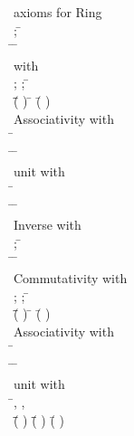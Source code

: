 \begin{hetcasl}
\> {\small{}\KW{\%\%} axioms for Ring}\\
\> \Ax{\forall}  \Ax{:} ; \= \Ax{:}  \\
\> \Ax{\bullet} \= \Ax{+}  \Ax{=} \= \Ax{+} \\
\> {\small{}\KW{\%} with \Ax{+}\Ax{\%}}\\
\> \Ax{\forall}  \Ax{:} ;  \Ax{:} ; \= \Ax{:}  \\
\> \Ax{\bullet} \=(\= \Ax{+} ) \Ax{+}  \Ax{=} \= \Ax{+} (\= \Ax{+} )\\
\> {\small{}\KW{\%\%} Associativity with \Ax{+}}\\
\> \Ax{\forall} \= \Ax{:}  \\
\> \Ax{\bullet} \= \Ax{+}  \Ax{=}  \Ax{\wedge} \= \Ax{+}  \Ax{=} \\
\> {\small{}\KW{\%\%}unit with \Ax{+}}\\
\> \Ax{\forall} \= \Ax{:}  \\
\> \Ax{\bullet} \=\Ax{\exists}  \Ax{:}  \Ax{\bullet} \= \Ax{+}  \Ax{=} \\
\> {\small{}\KW{\%\%}Inverse with \Ax{+}}\\
\> \Ax{\forall}  \Ax{:} ; \= \Ax{:}  \\
\> \Ax{\bullet} \= \Ax{*}  \Ax{=} \= \Ax{*} \\
\> {\small{}\KW{\%\%}Commutativity with \Ax{*}}\\
\> \Ax{\forall}  \Ax{:} ;  \Ax{:} ; \= \Ax{:}  \\
\> \Ax{\bullet} \=(\= \Ax{*} ) \Ax{*}  \Ax{=} \= \Ax{*} (\= \Ax{*} )\\
\> {\small{}\KW{\%\%}Associativity with \Ax{*}}\\
\> \Ax{\forall} \= \Ax{:}  \\
\> \Ax{\bullet} \= \Ax{*}  \Ax{=}  \Ax{\wedge} \= \Ax{*}  \Ax{=} \\
\> {\small{}\KW{\%\%}unit with \Ax{*}}\\
\> \Ax{\forall} \=, ,  \Ax{:}  \\
\> \Ax{\bullet} \=(\= \Ax{+} ) \Ax{*}  \Ax{=} \=(\= \Ax{*} ) \Ax{+} (\= \Ax{*} )\\

\end{hetcasl}

